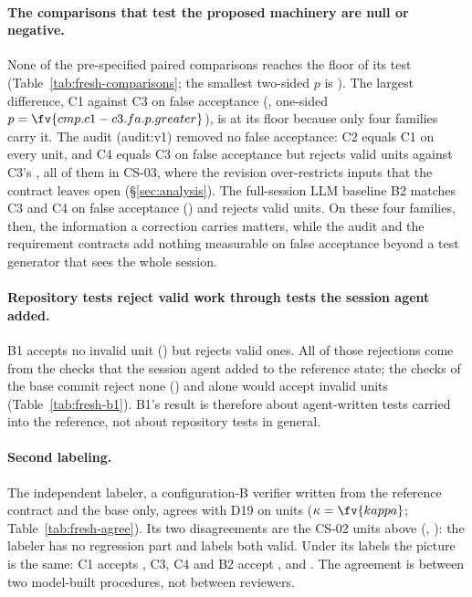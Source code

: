 
\paragraph{The comparisons that test the proposed machinery are null or negative.} None of the  pre-specified paired comparisons reaches the floor of its test (Table~\ref{tab:fresh-comparisons}; the smallest two-sided $p$ is ). The largest difference, C1 against C3 on false acceptance (, one-sided $p=\fv{cmp.c1-c3.fa.p.greater}$), is at its floor because only four families carry it. The audit (audit:v1) removed no false acceptance: C2 equals C1 on every unit, and C4 equals C3 on false acceptance but rejects  valid units against C3's , all of them in CS-03, where the revision over-restricts inputs that the contract leaves open (\S\ref{sec:analysis}). The full-session LLM baseline B2 matches C3 and C4 on false acceptance () and rejects  valid units. On these four families, then, the information a correction carries matters, while the audit and the requirement contracts add nothing measurable on false acceptance beyond a test generator that sees the whole session.


\paragraph{Repository tests reject valid work through tests the session agent added.} B1 accepts no invalid unit () but rejects  valid ones. All  of those rejections come from the  checks that the session agent added to the reference state; the  checks of the base commit reject none () and alone would accept  invalid units (Table~\ref{tab:fresh-b1}). B1's result is therefore about agent-written tests carried into the reference, not about repository tests in general.


\paragraph{Second labeling.} The independent labeler, a configuration-B verifier written from the reference contract and the base only, agrees with D19 on  units ($\kappa=\fv{kappa}$; Table~\ref{tab:fresh-agree}). Its two disagreements are the CS-02 units above (\texttt{}, \texttt{}): the labeler has no regression part and labels both valid. Under its labels the picture is the same: C1 accepts , C3, C4 and B2 accept ,  and . The agreement is between two model-built procedures, not between reviewers.

